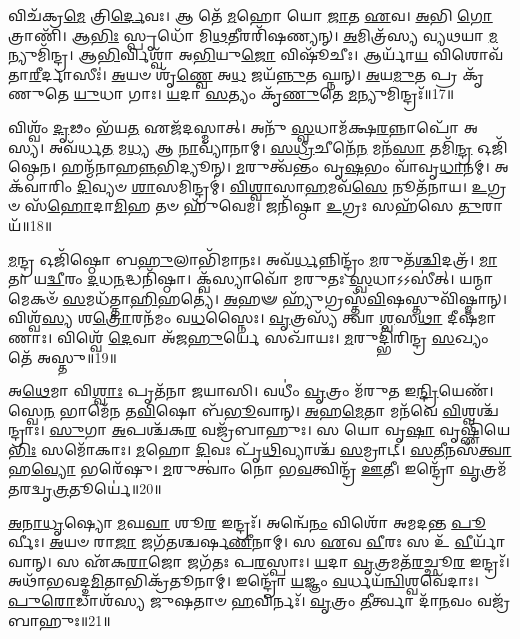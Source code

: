 𑌵𑌿𑌚᳴𑌕𑍍𑌰\-\ul{𑌮𑍇} 𑌤𑍍𑌰𑌿\-\ul{𑌰𑍍𑌦𑍇}\-𑌵𑌃।
𑌆 𑌤𑍇᳴ \ul{𑌮}\-𑌹𑍋 𑌯𑍋 \ul{𑌜𑌾}\-𑌤 \ul{𑌏}\-𑌵।
\-\ul{𑌅}\-𑌭𑌿 \ul{𑌗𑍋}\-𑌤𑍍𑌰𑌾𑌣𑌿᳴।
𑌆\-\ul{𑌭𑌿𑌃} 𑌸𑍍𑌪𑍃𑌧𑍋᳴ 𑌮𑌿\-\ul{𑌥}\-𑌤𑍀𑌰𑌰𑌿᳴𑌷𑌣𑍍𑌯𑌨𑍍।
\-\ul{𑌅}\-𑌮𑌿𑌤𑍍𑌰᳴𑌸𑍍𑌯 𑌵𑍍𑌯𑌥𑌯𑌾 \ul{𑌮}\-𑌨𑍍𑌯𑍁𑌮𑌿᳴𑌨𑍍𑌦𑍍𑌰।
𑌆\-\ul{𑌭𑌿}\-𑌰𑍍𑌵𑌿𑌶𑍍𑌵𑌾᳴ 𑌅\-\ul{𑌭𑌿}\-𑌯𑍁\-\ul{𑌜𑍋} 𑌵𑌿𑌷𑍂᳴𑌚𑍀𑌃।
𑌆𑌰𑍍𑌯𑌾᳴\-\ul{𑌯} 𑌵𑌿𑌶𑍋𑌵᳴𑌤𑌾\-\ul{𑌰𑍀}\-𑌰𑍍𑌦𑌾𑌸𑍀𑌃॑।
\-\ul{𑌅}\-𑌯𑍞 𑌶𑍃᳴\-\ul{𑌣𑍍𑌵𑍇} 𑌅\-\ul{𑌧} 𑌜𑌯᳴\-\ul{𑌨𑍍𑌨𑍁}\-𑌤 𑌘𑍍𑌨𑌨𑍍।
\-\ul{𑌅}\-𑌯\-\ul{𑌮𑍁}\-𑌤 𑌪𑍍𑌰 𑌕𑍃᳴𑌣𑍁𑌤𑍇 \ul{𑌯𑍁}\-𑌧𑌾 𑌗𑌾𑌃।
\-\ul{𑌯}\-𑌦𑌾 \ul{𑌸}\-𑌤𑍍𑌯𑌂 𑌕𑍃᳴\-\ul{𑌣𑍁}\-𑌤𑍇 \ul{𑌮}\-𑌨𑍍𑌯𑍁𑌮𑌿𑌨𑍍𑌦𑍍𑌰𑌃᳴॥17॥

𑌵𑌿𑌶𑍍𑌵𑌂᳴ \ul{𑌦𑍃}\-𑌢𑌂 𑌭᳴𑌯\-\ul{𑌤} 𑌏𑌜᳴𑌦𑌸𑍍𑌮𑌾𑌤𑍍।
𑌅𑌨𑍁᳴ \ul{𑌸𑍍𑌵}\-𑌧𑌾𑌮᳴𑌕𑍍𑌷\-\ul{𑌰}\-𑌨𑍍𑌨𑌾𑌪𑍋᳴ 𑌅𑌸𑍍𑌯।
𑌅𑌵᳴𑌰𑍍𑌧\-\ul{𑌤} 𑌮\-\ul{𑌧𑍍𑌯} 𑌆 \ul{𑌨𑌾}\-𑌵𑍍𑌯𑌾᳴𑌨𑌾𑌮𑍍।
\-\ul{𑌸}\-\-\ul{𑌧𑍍𑌰𑍀}\-𑌚𑍀𑌨𑍇᳴\-\ul{𑌨} 𑌮𑌨᳴\-\ul{𑌸𑌾} 𑌤𑌮𑌿᳴\-\ul{𑌨𑍍𑌦𑍍𑌰} 𑌓𑌜𑌿᳴𑌷𑍍𑌠𑍇𑌨।
𑌹𑌨𑍍𑌮᳴𑌨𑌾𑌹\-\ul{𑌨𑍍𑌨}\-𑌭𑌿𑌦𑍍𑌯𑍂𑌨𑍍।
\-\ul{𑌮}\-𑌰𑍁𑌤𑍍𑌵᳴𑌨𑍍𑌤𑌂 𑌵𑍃\-\ul{𑌷}\-𑌭𑌂 𑌵𑌾᳴𑌵𑍃\-\ul{𑌧𑌾}\-𑌨𑌮𑍍।
𑌅𑌕᳴𑌵𑌾𑌰𑌿𑌂 \ul{𑌦𑌿}\-𑌵𑍍𑌯𑍞 \ul{𑌶𑌾}\-𑌸𑌮𑌿𑌨𑍍𑌦𑍍𑌰𑌮𑍍॑।
\-\ul{𑌵𑌿}\-\-\ul{𑌶𑍍𑌵𑌾}\-𑌸𑌾\-\ul{𑌹}\-𑌮𑌵᳴\-\ul{𑌸𑍇} 𑌨𑍂𑌤᳴𑌨𑌾𑌯।
\-\ul{𑌉}\-𑌗𑍍𑌰𑍞 𑌸᳴\-\ul{𑌹𑍋}\-𑌦𑌾\-\ul{𑌮𑌿}\-𑌹 𑌤𑍞 𑌹𑍁᳴𑌵𑍇𑌮।
𑌜𑌨𑌿᳴𑌷𑍍𑌠𑌾 \ul{𑌉}\-𑌗𑍍𑌰𑌃 𑌸𑌹᳴𑌸𑍇 \ul{𑌤𑍁}\-𑌰𑌾𑌯᳴॥18॥

\-\ul{𑌮}\-𑌨𑍍𑌦𑍍𑌰 𑌓𑌜𑌿᳴𑌷𑍍𑌠𑍋 𑌬\-\ul{𑌹𑍁}\-𑌲𑌾𑌭𑌿᳴𑌮𑌾𑌨𑌃।
𑌅𑌵᳴\-\ul{𑌰𑍍𑌧}\-𑌨𑍍𑌨𑌿𑌨𑍍𑌦𑍍𑌰𑌂᳴ \ul{𑌮}\-𑌰𑍁𑌤᳴\-\ul{𑌶𑍍𑌚𑌿}\-𑌦𑌤𑍍𑌰᳴।
\-\ul{𑌮𑌾}\-𑌤𑌾 𑌯\-\ul{𑌦𑍍𑌵𑍀}\-𑌰𑌂 \ul{𑌦}\-𑌧\-\ul{𑌨}\-𑌦𑍍𑌧𑌨𑌿᳴𑌷𑍍𑌠𑌾।
𑌕𑍍𑌵᳴𑌸𑍍𑌯𑌾𑌵𑍋᳴ 𑌮𑌰𑍁𑌤𑌃 \ul{𑌸𑍍𑌵}\-𑌧𑌾\-𑌽𑌽𑌸𑍀॑𑌤𑍍।
𑌯𑌨𑍍𑌮𑌾𑌮𑍇𑌕𑍞᳴ \ul{𑌸}\-𑌮𑌧᳴𑌤𑍍𑌤𑌾\-\ul{𑌹𑌿}\-𑌹𑌤𑍍𑌯𑍇॑।
\-\ul{𑌅}\-𑌹𑍟 𑌹𑍍𑌯𑍁᳴𑌗𑍍𑌰𑌸𑍍𑌤᳴\-\ul{𑌵𑌿}\-𑌷𑌸𑍍𑌤𑍁𑌵𑌿᳴𑌷𑍍𑌮𑌾𑌨𑍍।
𑌵𑌿𑌶𑍍𑌵᳴\-\ul{𑌸𑍍𑌯} 𑌶\-\ul{𑌤𑍍𑌰𑍋}\-𑌰𑌨᳴𑌮𑌂 𑌵\-\ul{𑌧}\-𑌸𑍍𑌨𑍈𑌃।
\-\ul{𑌵𑍃}\-𑌤𑍍𑌰𑌸𑍍𑌯᳴ 𑌤𑍍𑌵𑌾 \ul{𑌶𑍍𑌵}\-𑌸\-\ul{𑌥𑌾} 𑌦𑍀𑌷᳴𑌮𑌾𑌣𑌾𑌃।
𑌵𑌿𑌶𑍍𑌵𑍇᳴ \ul{𑌦𑍇}\-𑌵𑌾 𑌅᳴𑌜\-\ul{𑌹𑍁}\-𑌰𑍍𑌯𑍇 𑌸𑌖𑌾᳴𑌯𑌃।
\-\ul{𑌮}\-𑌰𑍁𑌦𑍍𑌭𑌿᳴𑌰𑌿𑌨𑍍𑌦𑍍𑌰 \ul{𑌸}\-𑌖𑍍𑌯𑌂 𑌤𑍇᳴ 𑌅𑌸𑍍𑌤𑍁॥19॥

𑌅\-\ul{𑌥𑍇}\-𑌮𑌾 𑌵𑌿\-\ul{𑌶𑍍𑌵𑌾𑌃} 𑌪𑍃𑌤᳴𑌨𑌾 𑌜𑌯𑌾𑌸𑌿।
𑌵𑌧𑍀𑌂॑ \ul{𑌵𑍃}\-𑌤𑍍𑌰𑌂 𑌮᳴𑌰𑍁𑌤 𑌇\-\ul{𑌨𑍍𑌦𑍍𑌰𑌿}\-𑌯𑍇𑌣᳴।
𑌸𑍍𑌵𑍇\-\ul{𑌨} 𑌭𑌾𑌮𑍇᳴𑌨 𑌤\-\ul{𑌵𑌿}\-𑌷𑍋 𑌬᳴\-\ul{𑌭𑍂}\-𑌵𑌾𑌨𑍍।
\-\ul{𑌅}\-𑌹\-\ul{𑌮𑍇}\-𑌤𑌾 𑌮𑌨᳴𑌵𑍇 \ul{𑌵𑌿}\-𑌶𑍍𑌵𑌶𑍍𑌚᳴𑌨𑍍𑌦𑍍𑌰𑌾𑌃।
\-\ul{𑌸𑍁}\-𑌗𑌾 \ul{𑌅}\-𑌪𑌶𑍍𑌚᳴𑌕\-\ul{𑌰} 𑌵𑌜𑍍𑌰᳴𑌬𑌾𑌹𑍁𑌃।
𑌸 𑌯𑍋 𑌵𑍃\-\ul{𑌷𑌾} 𑌵𑍃𑌷𑍍𑌣𑌿᳴𑌯𑍇\-\ul{𑌭𑌿𑌃} 𑌸𑌮𑍋᳴𑌕𑌾𑌃।
\-\ul{𑌮}\-𑌹𑍋 \ul{𑌦𑌿}\-𑌵𑌃 𑌪𑍃᳴\-\ul{𑌥𑌿}\-𑌵𑍍𑌯𑌾𑌶𑍍𑌚᳴ \ul{𑌸}\-𑌮𑍍𑌰𑌾𑌟𑍍।
\-\ul{𑌸}\-\-\ul{𑌤𑍀}\-𑌨𑌸᳴\-\ul{𑌤𑍍𑌵𑌾} 𑌹\-\ul{𑌵𑍍𑌯𑍋} 𑌭𑌰𑍇᳴𑌷𑍁।
\-\ul{𑌮}\-𑌰𑍁𑌤𑍍𑌵𑌾𑌂॑ 𑌨𑍋 𑌭\-\ul{𑌵}\-𑌤𑍍𑌵𑌿𑌨𑍍𑌦𑍍𑌰᳴ \ul{𑌊}\-𑌤𑍀।
𑌇𑌨𑍍𑌦𑍍𑌰𑍋᳴ \ul{𑌵𑍃}\-𑌤𑍍𑌰𑌮᳴𑌤𑌰𑌦𑍍𑌵𑍃\-\ul{𑌤𑍍𑌰}\-𑌤𑍂𑌰𑍍𑌯𑍇॑॥20॥

\-\ul{𑌅}\-\-\ul{𑌨𑌾}\-\-\ul{𑌧𑍃}\-𑌷𑍍𑌯𑍋 \ul{𑌮}\-𑌘\-\ul{𑌵𑌾} 𑌶𑍂\-\ul{𑌰} 𑌇𑌨𑍍𑌦𑍍𑌰𑌃᳴।
𑌅𑌨𑍍𑌵𑍇᳴\-\ul{𑌨𑌂} 𑌵𑌿𑌶𑍋᳴ 𑌅𑌮𑌦𑌨𑍍𑌤 \ul{𑌪𑍂}\-𑌰𑍍𑌵𑍀𑌃।
\-\ul{𑌅}\-𑌯𑍞 𑌰𑌾\-\ul{𑌜𑌾} 𑌜𑌗᳴𑌤𑌶𑍍𑌚𑌰𑍍\mbox{}𑌷\-\ul{𑌣𑍀}\-𑌨𑌾𑌮𑍍।
𑌸 \ul{𑌏}\-𑌵 \ul{𑌵𑍀}\-𑌰𑌃 𑌸 𑌉᳴ \ul{𑌵𑍀}\-𑌰𑍍𑌯𑌾᳴𑌵𑌾𑌨𑍍।
𑌸 𑌏᳴𑌕\-\ul{𑌰𑌾}\-𑌜𑍋 𑌜𑌗᳴𑌤𑌃 𑌪\-\ul{𑌰}\-𑌸𑍍𑌪𑌾𑌃।
\-\ul{𑌯}\-𑌦𑌾 \ul{𑌵𑍃}\-𑌤𑍍𑌰𑌮𑌤᳴\-\ul{𑌰}\-𑌚𑍍𑌛𑍂\-\ul{𑌰} 𑌇𑌨𑍍𑌦𑍍𑌰𑌃᳴।
𑌅𑌥𑌾᳴𑌭𑌵𑌦𑍍𑌦\-\ul{𑌮𑌿}\-𑌤𑌾𑌭𑌿𑌕𑍍𑌰᳴𑌤𑍂𑌨𑌾𑌮𑍍।
𑌇𑌨𑍍𑌦𑍍𑌰𑍋᳴ \ul{𑌯}\-𑌜𑍍𑌞𑌂 \ul{𑌵}\-𑌰𑍍𑌧𑌯᳴\-\ul{𑌨𑍍𑌵𑌿}\-𑌶𑍍𑌵𑌵𑍇᳴𑌦𑌾𑌃।
\-\ul{𑌪𑍁}\-\-\ul{𑌰𑍋}\-𑌡𑌾𑌶᳴𑌸𑍍𑌯 𑌜𑍁𑌷𑌤𑌾𑍞 \ul{𑌹}\-𑌵𑌿𑌰𑍍𑌨𑌃᳴।
\-\ul{𑌵𑍃}\-𑌤𑍍𑌰𑌂 \ul{𑌤𑍀}\-𑌰𑍍𑌤𑍍𑌵𑌾 𑌦𑌾᳴\-\ul{𑌨}\-𑌵𑌂 𑌵𑌜𑍍𑌰᳴𑌬𑌾𑌹𑍁𑌃॥21॥

